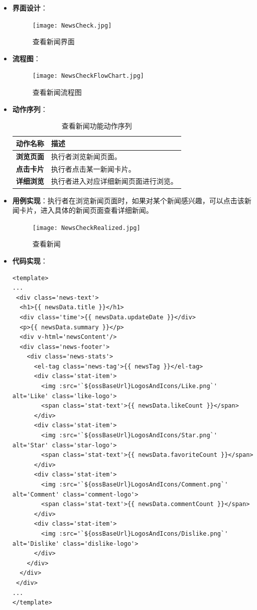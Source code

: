 \begin{itemize}
	\item \textbf{界面设计}：
	\begin{figure}[H]
		\centering
		\texttt{[image: NewsCheck.jpg]}
		\caption{查看新闻界面}
		\label{NewsCheck}
	\end{figure}
	\item \textbf{流程图}：
	\begin{figure}[H]
		\centering
		\texttt{[image: NewsCheckFlowChart.jpg]}
		\caption{查看新闻流程图}
		\label{NewsCheckFlowChart}
	\end{figure}
	\item \textbf{动作序列}：
	\begin{table}[H]
		\centering
		\caption{查看新闻功能动作序列}
		\renewcommand\arraystretch{1.5}
		\begin{tabular}{|c|>{\raggedright\arraybackslash}p{10cm}|}
			\hline
			\textbf{动作名称} & \textbf{描述} \\ \hline
			\textbf{浏览页面} & 执行者浏览新闻页面。 \\ \hline
			\textbf{点击卡片} & 执行者点击某一新闻卡片。 \\ \hline
			\textbf{详细浏览} & 执行者进入对应详细新闻页面进行浏览。 \\ \hline
		\end{tabular}
	\end{table}
	\item \textbf{用例实现}：执行者在浏览新闻页面时，如果对某个新闻感兴趣，可以点击该新闻卡片，进入具体的新闻页面查看详细新闻。
	\begin{figure}[H]
		\centering
		\texttt{[image: NewsCheckRealized.jpg]}
		\caption{查看新闻}
		\label{NewsCheckRealized}
	\end{figure}
	\item \textbf{代码实现}：
	\begin{verbatim}
<template>
...
 <div class='news-text'>
  <h1>{{ newsData.title }}</h1>
  <div class='time'>{{ newsData.updateDate }}</div>
  <p>{{ newsData.summary }}</p>
  <div v-html='newsContent'/>
  <div class='news-footer'>
    <div class='news-stats'>
      <el-tag class='news-tag'>{{ newsTag }}</el-tag>
      <div class='stat-item'>
        <img :src='`${ossBaseUrl}LogosAndIcons/Like.png`' alt='Like' class='like-logo'>
        <span class='stat-text'>{{ newsData.likeCount }}</span>
      </div>
      <div class='stat-item'>
        <img :src='`${ossBaseUrl}LogosAndIcons/Star.png`' alt='Star' class='star-logo'>
        <span class='stat-text'>{{ newsData.favoriteCount }}</span>
      </div>
      <div class='stat-item'>
        <img :src='`${ossBaseUrl}LogosAndIcons/Comment.png`' alt='Comment' class='comment-logo'>
        <span class='stat-text'>{{ newsData.commentCount }}</span>
      </div>
      <div class='stat-item'>
        <img :src='`${ossBaseUrl}LogosAndIcons/Dislike.png`' alt='Dislike' class='dislike-logo'>
      </div>
    </div>
  </div>
 </div>
...
</template>
	\end{verbatim}
\end{itemize}

